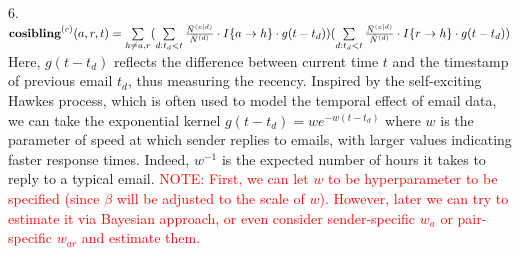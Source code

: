 \documentclass[a4paper]{article}
\begin{document}
6. $\textbf{cosibling}^{(c)}(a, r, t)=\sum\limits_{h \neq a, r}\Large(\sum\limits_{d: t_d<t} \frac{\bar N^{(c|d)}}{\bar N^{(d)}}\cdot I\{a\rightarrow h\}\cdot g(t-t_d)\Large)\Large(\sum\limits_{d: t_d<t} \frac{\bar N^{(c|d)}}{\bar N^{(d)}}\cdot I\{r\rightarrow h\}\cdot g(t-t_d)\Large)$\\\newline
Here, $g(t-t_d)$ reflects the difference between current time $t$ and the timestamp of previous email $t_d$, thus measuring the recency. Inspired by the self-exciting Hawkes process, which is often used to model the temporal effect of email data, we can take the exponential kernel $g(t-t_d)=we^{-w(t-t_d)}$ where $w$ is the parameter of speed at
which sender replies to emails, with larger values indicating faster response times. Indeed, $w^{-1}$ is the expected number of hours it takes to reply to a typical email. \textcolor{red}{NOTE: First, we can let $w$ to be hyperparameter to be specified (since $\beta$ will be adjusted to the scale of $w$). However, later we can try to estimate it via Bayesian approach, or even consider sender-specific $w_a$ or pair-specific $w_{ar}$ and estimate them.}
\end{document}
